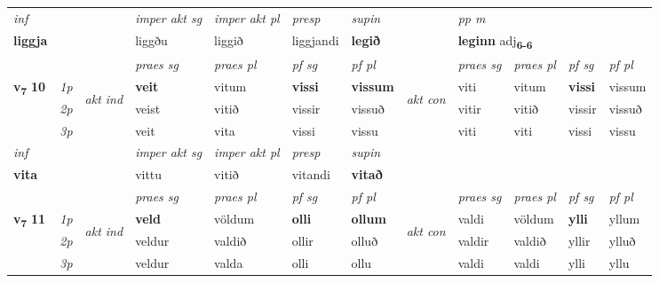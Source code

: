 \begin{longtable}[l]{X>{\footnotesize\itshape}llXXXXlXXXX}
\cmidrule{4-7}
   {\textit{inf}} & &  & \textit{imper akt sg} & \textit{imper akt pl}   & \textit{presp} & \textit{supin}  && \textit{pp m} \\*
  {\textbf{liggja}} & && liggðu  & liggið   & liggjandi &  \textbf{legið}  && \multicolumn{2}{l}{\textbf{leginn} adj\textbf{\textsubscript{6-6}}} \\*

\midrule

 & &   & \textit{praes sg}  & \textit{praes pl}    & \textit{ pf sg} & \textit{pf pl} & & \textit{praes sg}  & \textit{praes pl}    & \textit{pf sg} & \textit{pf pl }  \\ \cmidrule{4-7} \cmidrule{9-12}
 \multirow{2}{*}{{{\textbf{v{\textsubscript{7}}} \Large{\textbf{10}}}}}  & 1p & \multirow{3}{*}{\begin{turn}{90}\textit{akt ind}\end{turn}} & \textbf{veit} & vitum & \textbf{vissi} & \textbf{vissum} & \multirow{3}{*}{\begin{turn}{90}\textit{akt con}\end{turn}} &viti & vitum & \textbf{vissi} & vissum\\*
 & 2p &  &  veist  & vitið & vissir & vissuð & & vitir & vitið & vissir & vissuð \\*
 & 3p &  & veit & vita & vissi & vissu & & viti & viti& vissi & vissu \\*
\cmidrule{4-7} \cmidrule{9-12}

   {\textit{inf}} & &  & \textit{imper akt sg} & \textit{imper akt pl}   & \textit{presp} & \textit{supin}   \\*
  {\textbf{vita}} & && vittu  & vitið   & vitandi &  \textbf{vitað}   \\*

\midrule

 & &   & \textit{praes sg}  & \textit{praes pl}    & \textit{ pf sg} & \textit{pf pl} & & \textit{praes sg}  & \textit{praes pl}    & \textit{pf sg} & \textit{pf pl }  \\ \cmidrule{4-7} \cmidrule{9-12}
 \multirow{2}{*}{{{\textbf{v{\textsubscript{7}}} \Large{\textbf{11}}}}}  & 1p & \multirow{3}{*}{\begin{turn}{90}\textit{akt ind}\end{turn}} & \textbf{veld} & völdum & \textbf{olli} & \textbf{ollum} & \multirow{3}{*}{\begin{turn}{90}\textit{akt con}\end{turn}} &valdi & völdum & \textbf{ylli} & yllum\\*
 & 2p &  &  veldur  & valdið & ollir & olluð & & valdir & valdið & yllir & ylluð \\*
 & 3p &  & veldur & valda & olli & ollu & & valdi & valdi& ylli & yllu \\*
\cmidrule{4-7} \cmidrule{9-12}


\end{longtable}
